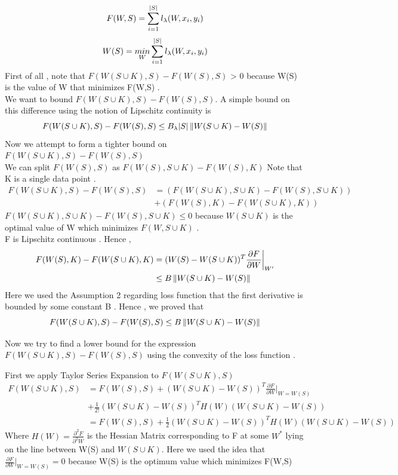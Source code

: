 \documentclass[12pt]{article}
\begin{document}
$$F(W,S) = \sum_{i = 1}^{|S|} l_{\lambda}(W,x_i,y_i)$$
$$W(S) = \underset{W}{min}\sum_{i = 1}^{|S|} l_{\lambda}(W,x_i,y_i)$$
 First of all , note that $F(W(S \cup K),S) - F(W(S),S)$ > 0 because W(S) is the value of W that minimizes F(W,S) . \\ 
We want to bound $F(W(S \cup K),S) - F(W(S),S)$. A simple bound on this difference using the notion of Lipschitz continuity is
$$ F(W(S \cup K),S) - F(W(S),S) \leq B_{\lambda}|S| \left\Vert W(S \cup K) - W(S)\right\Vert$$
Now we attempt to form a tighter bound on $F(W(S \cup K),S) - F(W(S),S)$ \\
We can split $F(W(S),S)$ as $F(W(S),S \cup K) - F(W(S),K)$
\noindent
Note that K is a single data point .
 \begin{align*}
     F(W(S \cup K),S) - F(W(S),S) &= (F(W(S \cup K),S \cup K) - F(W(S),S \cup K)) \\
     & + (F(W(S),K) - F(W(S \cup K),K)) 
 \end{align*}
\noindent
$F(W(S \cup K),S \cup K) - F(W(S),S \cup K) \leq 0 $ because $W(S \cup K)$ is the optimal value of W which minimizes $F(W,S \cup K)$ .\\
F is Lipschitz continuous . Hence ,
\begin{align*}
    F(W(S),K) - F(W(S \cup K),K)  &= (W(S) - W(S \cup K))^T\frac{\partial F}{\partial W}\bigg|_{W'} \\
    & \leq B\left\Vert W(S \cup K) - W(S)\right\Vert
\end{align*}
Here we used the Assumption 2 regarding loss function that the first derivative is bounded by some constant B .
\noindent
Hence , we proved that 
\begin{equation}
    \label{ineq1}
    F(W(S \cup K),S) - F(W(S),S) \leq B\left\Vert W(S \cup K) - W(S)\right\Vert
\end{equation}

Now we try to find a lower bound for the expression $F(W(S \cup K),S) - F(W(S),S)$ using the convexity of the loss function .

First we apply Taylor Series Expansion to $F(W(S \cup K),S)$
\begin{align}
    F(W(S \cup K),S)  &=  F(W(S),S) + (W(S \cup K) - W(S))^T\frac{\partial F}{\partial W}\bigg|_{W = W(S)} \nonumber \\
    & + \frac{1}{2!}(W(S \cup K) - W(S))^T H(W)(W(S \cup K) - W(S)) \nonumber \\
    &= F(W(S),S)  + \frac{1}{2}(W(S \cup K) - W(S))^T H(W)(W(S \cup K) - W(S))
    \label{ineq}
\end{align}
Where $H(W) = \frac{\partial^2 F}{\partial^2 W}$ is the Hessian Matrix  corresponding to F at some $W^*$ lying on the line between W(S) and $W(S \cup K)$.
Here we used the idea that $\frac{\partial F}{\partial W}|_{W = W(S)} = 0$ because W(S) is the optimum value which minimizes F(W,S)
\end{document}
